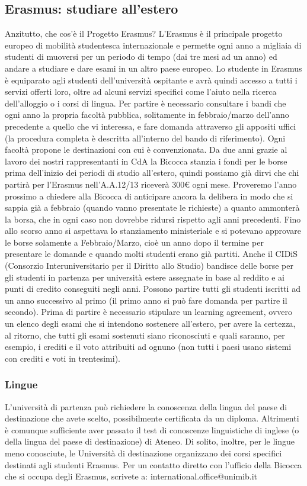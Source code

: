 \subsection{Erasmus: studiare all'estero}
Anzitutto, che cos'è il Progetto Erasmus? L'Erasmus è il principale progetto europeo di mobilità studentesca internazionale e permette ogni anno a migliaia di studenti di muoversi per un periodo di tempo (dai tre mesi ad un anno) ed andare a studiare e dare esami in un altro paese europeo. Lo studente in Erasmus è equiparato agli studenti dell'università ospitante e avrà quindi accesso a tutti i servizi offerti loro, oltre ad alcuni servizi specifici come l'aiuto nella ricerca dell'alloggio o i corsi di lingua. Per partire è necessario consultare i bandi che ogni anno la propria facoltà pubblica, solitamente in febbraio/marzo dell'anno precedente a quello che vi interessa, e fare domanda attraverso gli appositi uffici (la procedura completa è descritta all'interno del bando di riferimento). 
Ogni facoltà propone le destinazioni con cui è convenzionata. Da due anni grazie al lavoro dei nostri rappresentanti in CdA la Bicocca stanzia i fondi per le borse prima dell'inizio dei periodi di studio all'estero, quindi possiamo già dirvi che chi partirà per l'Erasmus nell'A.A.12/13 riceverà 300€ ogni mese. Proveremo l'anno prossimo a chiedere alla Bicocca di anticipare ancora la delibera in modo che si sappia già a febbraio (quando vanno presentate le richieste) a quanto ammonterà la borsa, che in ogni caso non dovrebbe ridursi rispetto agli anni precedenti. Fino allo scorso anno si aspettava lo stanziamento ministeriale e si potevano approvare le borse solamente a Febbraio/Marzo, cioè un anno dopo il termine per presentare le domande e quando molti studenti erano già partiti. Anche il CIDiS (Consorzio Interuniversitario per il Diritto allo Studio) bandisce delle borse per gli studenti in partenza per università estere assegnate in base al reddito e ai punti di credito conseguiti negli anni. Possono partire tutti gli studenti iscritti ad un anno successivo al primo (il primo anno si può fare domanda per partire il secondo). Prima di partire è necessario stipulare un learning agreement, ovvero un elenco degli esami che si intendono sostenere all'estero, per avere la certezza, al ritorno, che tutti gli esami sostenuti siano riconosciuti e quali saranno, per esempio, i crediti e il voto attribuiti ad ognuno (non tutti i paesi usano sistemi con crediti e voti in trentesimi).

\subsubsection{Lingue}
L'università di partenza può richiedere la conoscenza della lingua del paese di destinazione che avete scelto, possibilmente certificata da un diploma. Altrimenti è comunque sufficiente aver passato il test di conoscenze linguistiche di inglese (o della lingua del paese di destinazione) di Ateneo. Di solito, inoltre, per le lingue meno conosciute, le Università di destinazione organizzano dei corsi specifici destinati agli studenti Erasmus.
Per un contatto diretto con l'ufficio della Bicocca che si occupa degli Erasmus, scrivete a: international.office@unimib.it

